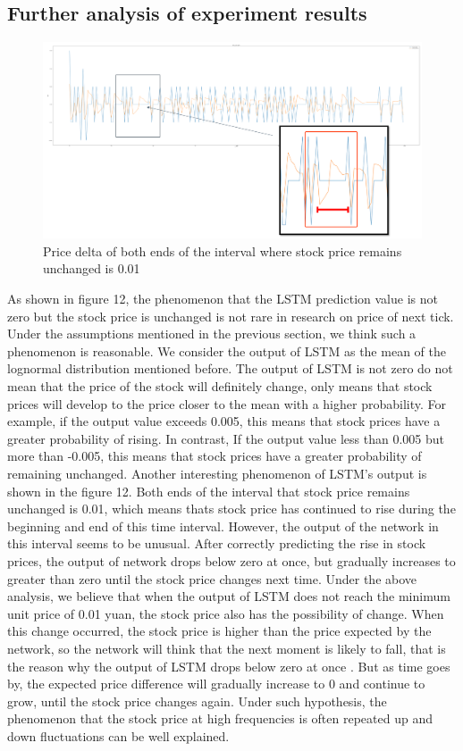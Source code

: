 \documentclass[10pt, conference, compsocconf]{IEEEtran}
\begin{document}
\subsection{Further analysis of experiment results}
\begin{figure}[ht]
	\centering
	\includegraphics[scale=0.4]{zoom.png}
	\caption{Price delta of both ends of the interval where stock price remains unchanged is 0.01} \label{fig 13}
\end{figure}
As shown in figure 12, the phenomenon that the LSTM prediction value is not zero but the stock price is unchanged is not rare in research on 
price of next tick. Under the assumptions mentioned in the previous section, we think such a phenomenon is reasonable. We consider the output 
of LSTM as the mean of the lognormal distribution mentioned before. The output of LSTM is not zero do not mean that the price of the stock 
will definitely change, only means that stock prices will develop to the price closer to the mean with a higher probability. For example, 
if the output value exceeds 0.005, this means that stock prices have a greater probability of rising. In contrast, If the output value less 
than 0.005 but more than -0.005, this means that stock prices have a greater probability of remaining unchanged. 
Another interesting phenomenon of LSTM’s output is shown in the figure 12. Both ends of the interval that stock price remains unchanged is 
0.01, which means thats stock price has continued to rise during the beginning and end of this time interval. However, the output of the 
network in this interval seems to be unusual. After correctly predicting the rise in stock prices, the output of network drops below zero 
at once, but gradually increases to greater than zero until the stock price changes next time. Under the above analysis, we believe that 
when the output of LSTM does not reach the minimum unit price of 0.01 yuan, the stock price also has the possibility of  change. When this 
change occurred, the stock price is higher than the price expected by the network, so the network will think that the next moment is likely 
to fall, that is the reason why the output of LSTM drops below zero at once . But as time goes by, the expected price difference will 
gradually increase to 0 and continue to grow, until the stock price changes again. Under such  hypothesis, the phenomenon that the stock 
price at high frequencies is often repeated up and down fluctuations can be well explained.
\end{document}
